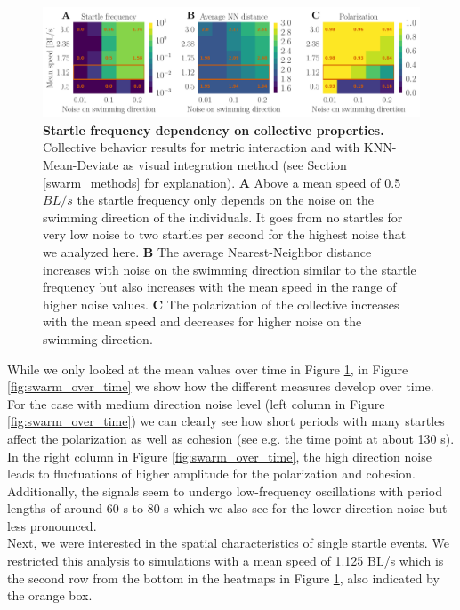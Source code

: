     \begin{figure}[H]
    \begin{center}
    \includegraphics[width=\textwidth]{looming_swarm_fixed_rhonull_int_type_matrix_vis_method_knn_mean_deviate_new.pdf}
    \end{center}
    \caption{\textbf{Startle frequency dependency on collective properties.} Collective behavior results for metric interaction and with KNN-Mean-Deviate as visual integration method (see Section \ref{swarm_methods} for explanation). \textbf{A} Above a mean speed of 0.5 $BL/s$ the startle frequency only depends on the noise on the swimming direction of the individuals. It goes from no startles for very low noise to two startles per second for the highest noise that we analyzed here. \textbf{B} The average Nearest-Neighbor distance increases with noise on the swimming direction similar to the startle frequency but also increases with the mean speed in the range of higher noise values. \textbf{C} The polarization of the collective increases with the mean speed and decreases for higher noise on the swimming direction.}
    \label{fig:swarm_heatmaps}
    \end{figure}
    While we only looked at the mean values over time in Figure \ref{fig:swarm_heatmaps}, in Figure \ref{fig:swarm_over_time} we show how the different measures develop over time.
    For the case with medium direction noise level (left column in Figure \ref{fig:swarm_over_time}) we can clearly see how short periods with many startles affect the polarization as well as cohesion (see e.g. the time point at about 130 s).
    In the right column in Figure \ref{fig:swarm_over_time}, the high direction noise leads to fluctuations of higher amplitude for the polarization and cohesion.
    Additionally, the signals seem to undergo low-frequency oscillations with period lengths of around 60 s to 80 s which we also see for the lower direction noise but less pronounced.\\
    Next, we were interested in the spatial characteristics of single startle events.
    We restricted this analysis to simulations with a mean speed of 1.125 BL/s which is the second row from the bottom in the heatmaps in Figure \ref{fig:swarm_heatmaps}, also indicated by the orange box.
